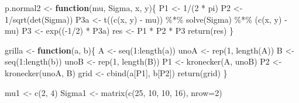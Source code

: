 \documentclass[
  10pt,
  spanish,
]{book}
\newenvironment{Shaded}{\begin{snugshade}}{\end{snugshade}}
\newcommand{\AttributeTok}[1]{\textcolor[rgb]{0.77,0.63,0.00}{#1}}
\newcommand{\ControlFlowTok}[1]{\textcolor[rgb]{0.13,0.29,0.53}{\textbf{#1}}}
\newcommand{\DecValTok}[1]{\textcolor[rgb]{0.00,0.00,0.81}{#1}}
\newcommand{\FunctionTok}[1]{\textcolor[rgb]{0.00,0.00,0.00}{#1}}
\newcommand{\NormalTok}[1]{#1}
\newcommand{\OtherTok}[1]{\textcolor[rgb]{0.56,0.35,0.01}{#1}}
\newcommand{\SpecialCharTok}[1]{\textcolor[rgb]{0.00,0.00,0.00}{#1}}
\theoremstyle{definition}
\theoremstyle{definition}
\theoremstyle{definition}
\theoremstyle{definition}
\theoremstyle{remark}
\begin{document}
\begin{Shaded}
\begin{Highlighting}[]
\NormalTok{p.normal2 }\OtherTok{\textless{}{-}} \ControlFlowTok{function}\NormalTok{(mu, Sigma, x, y)\{}
\NormalTok{  P1  }\OtherTok{\textless{}{-}} \DecValTok{1}\SpecialCharTok{/}\NormalTok{(}\DecValTok{2} \SpecialCharTok{*}\NormalTok{ pi)}
\NormalTok{  P2  }\OtherTok{\textless{}{-}} \DecValTok{1}\SpecialCharTok{/}\FunctionTok{sqrt}\NormalTok{(}\FunctionTok{det}\NormalTok{(Sigma))}
\NormalTok{  P3a }\OtherTok{\textless{}{-}} \FunctionTok{t}\NormalTok{((}\FunctionTok{c}\NormalTok{(x, y) }\SpecialCharTok{{-}}\NormalTok{ mu)) }\SpecialCharTok{\%*\%} \FunctionTok{solve}\NormalTok{(Sigma) }\SpecialCharTok{\%*\%}\NormalTok{ (}\FunctionTok{c}\NormalTok{(x, y) }\SpecialCharTok{{-}}\NormalTok{ mu)}
\NormalTok{  P3  }\OtherTok{\textless{}{-}} \FunctionTok{exp}\NormalTok{((}\SpecialCharTok{{-}}\DecValTok{1}\SpecialCharTok{/}\DecValTok{2}\NormalTok{) }\SpecialCharTok{*}\NormalTok{ P3a)}
\NormalTok{  res }\OtherTok{\textless{}{-}}\NormalTok{ P1 }\SpecialCharTok{*}\NormalTok{ P2 }\SpecialCharTok{*}\NormalTok{ P3}
  \FunctionTok{return}\NormalTok{(res)}
\NormalTok{\}}

\NormalTok{grilla }\OtherTok{\textless{}{-}} \ControlFlowTok{function}\NormalTok{(a, b)\{}
\NormalTok{  A }\OtherTok{\textless{}{-}} \FunctionTok{seq}\NormalTok{(}\DecValTok{1}\SpecialCharTok{:}\FunctionTok{length}\NormalTok{(a))}
\NormalTok{  unoA }\OtherTok{\textless{}{-}} \FunctionTok{rep}\NormalTok{(}\DecValTok{1}\NormalTok{, }\FunctionTok{length}\NormalTok{(A))}
\NormalTok{  B }\OtherTok{\textless{}{-}} \FunctionTok{seq}\NormalTok{(}\DecValTok{1}\SpecialCharTok{:}\FunctionTok{length}\NormalTok{(b))}
\NormalTok{  unoB }\OtherTok{\textless{}{-}} \FunctionTok{rep}\NormalTok{(}\DecValTok{1}\NormalTok{, }\FunctionTok{length}\NormalTok{(B))}
\NormalTok{  P1 }\OtherTok{\textless{}{-}} \FunctionTok{kronecker}\NormalTok{(A, unoB)}
\NormalTok{  P2 }\OtherTok{\textless{}{-}} \FunctionTok{kronecker}\NormalTok{(unoA, B)}
\NormalTok{  grid }\OtherTok{\textless{}{-}} \FunctionTok{cbind}\NormalTok{(a[P1], b[P2])}
  \FunctionTok{return}\NormalTok{(grid)}
\NormalTok{\}}

\NormalTok{mu1 }\OtherTok{\textless{}{-}} \FunctionTok{c}\NormalTok{(}\DecValTok{2}\NormalTok{, }\DecValTok{4}\NormalTok{)}
\NormalTok{Sigma1 }\OtherTok{\textless{}{-}} \FunctionTok{matrix}\NormalTok{(}\FunctionTok{c}\NormalTok{(}\DecValTok{25}\NormalTok{, }\DecValTok{10}\NormalTok{, }\DecValTok{10}\NormalTok{, }\DecValTok{16}\NormalTok{), }\AttributeTok{nrow=}\DecValTok{2}\NormalTok{)}


\end{Highlighting}
\end{Shaded}
\end{document}
